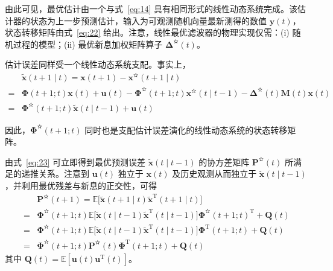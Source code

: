 由此可见，最优估计由一个与式~\eqref{eq:14} 具有相同形式的线性动态系统完成。该估计器的状态为上一步预测估计，输入为可观测随机向量最新测得的数值 $\bm{y}(t)$，状态转移矩阵由式~\eqref{eq:22} 给出。注意，线性最优滤波器的物理实现仅需：(i) 随机过程的模型；(ii) 最优新息加权矩阵算子 $\bm{\Delta}^{\text{✫}}(t)$。

估计误差同样受一个线性动态系统支配。事实上，
\begin{equation}\label{eq:23}
\begin{aligned}
&\tilde{\bm{x}}(t + 1 \mid t) = \bm{x}(t + 1) - \bm{x}^{\text{✫}}(t + 1 \mid t) \\
= &\bm{\Phi}(t + 1; t)\bm{x}(t) + \bm{u}(t) - \bm{\Phi}^{\text{✫}}(t + 1; t)\bm{x}^{\text{✫}}(t \mid t - 1) - \bm{\Delta}^{\text{✫}}(t)\bm{M}(t)\bm{x}(t) \\
= &\bm{\Phi}^{\text{✫}}(t + 1; t)\tilde{\bm{x}}(t \mid t - 1) + \bm{u}(t)
\end{aligned}
\end{equation}



因此，$\bm{\Phi}^{\text{✫}}(t + 1; t)$ 同时也是支配估计误差演化的线性动态系统的状态转移矩阵。

由式~\eqref{eq:23} 可立即得到最优预测误差 $\tilde{\bm{x}}(t \mid t - 1)$ 的协方差矩阵 $\bm{P}^{\text{✫}}(t)$ 所满足的递推关系。注意到 $\bm{u}(t)$ 独立于 $\bm{x}(t)$ 及历史观测从而独立于 $\tilde{\bm{x}}(t \mid t - 1)$，并利用最优残差与新息的正交性，可得
\begin{equation}\label{eq:24}
\begin{aligned}
&\bm{P}^{\text{✫}}(t + 1) = \mathbb{E}\bigl[\tilde{\bm{x}}(t + 1 \mid t)\tilde{\bm{x}}^{\mathrm{T}}(t + 1 \mid t)\bigr] \\
= &\bm{\Phi}^{\text{✫}}(t + 1; t)\mathbb{E}\bigl[\tilde{\bm{x}}(t \mid t - 1)\tilde{\bm{x}}^{\mathrm{T}}(t \mid t - 1)\bigr]\bm{\Phi}^{\text{✫}}(t + 1; t)^{\mathrm{T}} + \bm{Q}(t) \\
= &\bm{\Phi}^{\text{✫}}(t + 1; t)\mathbb{E}\bigl[\tilde{\bm{x}}(t \mid t - 1)\tilde{\bm{x}}^{\mathrm{T}}(t \mid t - 1)\bigr]\bm{\Phi}^{\mathrm{T}}(t + 1; t) + \bm{Q}(t) \\
= &\bm{\Phi}^{\text{✫}}(t + 1; t)\bm{P}^{\text{✫}}(t)\bm{\Phi}^{\mathrm{T}}(t + 1; t) + \bm{Q}(t)
\end{aligned}
\end{equation}
其中 $\bm{Q}(t) = \mathbb{E}[\bm{u}(t)\bm{u}^{\mathrm{T}}(t)]$。


